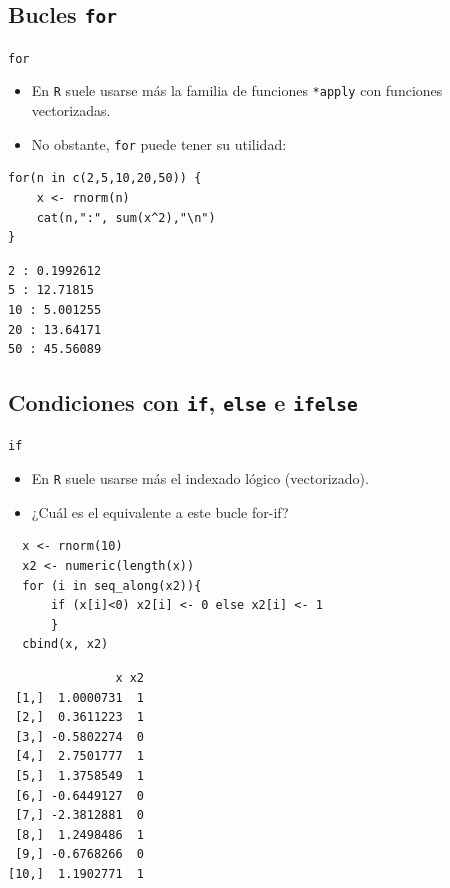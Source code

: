 \documentclass[xcolor={usenames,svgnames,dvipsnames}]{beamer}
\begin{document}
\subsection{Bucles \texttt{for}}
\label{sec:org7b10f89}
\begin{frame}[fragile,label={sec:org760fe10}]{\texttt{for}}
 \begin{itemize}
\item En \texttt{R} suele usarse más la familia de funciones \texttt{*apply} con funciones vectorizadas.
\item No obstante, \texttt{for} puede tener su utilidad:
\end{itemize}
\lstset{language=r,label= ,caption= ,captionpos=b,numbers=none}
\begin{lstlisting}
for(n in c(2,5,10,20,50)) {
    x <- rnorm(n)
    cat(n,":", sum(x^2),"\n")
}
\end{lstlisting}

\begin{verbatim}
2 : 0.1992612 
5 : 12.71815 
10 : 5.001255 
20 : 13.64171 
50 : 45.56089
\end{verbatim}
\end{frame}

\subsection{Condiciones con \texttt{if}, \texttt{else} e \texttt{ifelse}}
\label{sec:org33b7abd}
\begin{frame}[fragile,label={sec:org24919c0}]{\texttt{if}}
 \begin{itemize}
\item En \texttt{R} suele usarse más el indexado lógico (vectorizado).
\item ¿Cuál es el equivalente a este bucle for-if?
\end{itemize}
\lstset{language=r,label= ,caption= ,captionpos=b,numbers=none}
\begin{lstlisting}
  x <- rnorm(10)
  x2 <- numeric(length(x))
  for (i in seq_along(x2)){
      if (x[i]<0) x2[i] <- 0 else x2[i] <- 1
      }
  cbind(x, x2)
\end{lstlisting}

\begin{verbatim}
               x x2
 [1,]  1.0000731  1
 [2,]  0.3611223  1
 [3,] -0.5802274  0
 [4,]  2.7501777  1
 [5,]  1.3758549  1
 [6,] -0.6449127  0
 [7,] -2.3812881  0
 [8,]  1.2498486  1
 [9,] -0.6768266  0
[10,]  1.1902771  1
\end{verbatim}
\end{frame}
\end{document}
